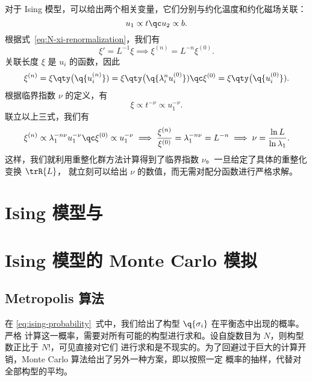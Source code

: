 对于 Ising 模型，可以给出两个相关变量，它们分别与约化温度和约化磁场关联：
\begin{equation}
  u_1 \propto t \qc u_2 \propto b.
\end{equation}
根据式~\eqref{eq:N-xi-renormalization}，我们有
\begin{equation}
  \xi' = L^{-1} \xi \implies \xi^{(n)} = L^{-n} \xi^{(0)}.
\end{equation}
关联长度 $\xi$ 是 $u_i$ 的函数，因此
\begin{equation}
  \xi^{(n)} = \xi\qty\big(\q{u_i^{(n)}}) = \xi\qty\big(\q{\lambda_i^n u_i^{(0)}}) \qc
  \xi^{(0)} = \xi\qty\big(\q{u_i^{(0)}}).
\end{equation}
根据临界指数 $\nu$ 的定义，有
\begin{equation}
  \xi \propto t^{-\nu} \propto u_1^{-\nu}.
\end{equation}
联立以上三式，我们有
\begin{equation}
  \xi^{(n)} \propto \lambda_1^{-n\nu} u_1^{-\nu} \qc
  \xi^{(0)} \propto u_1^{-\nu}
  \implies \frac{\xi^{(n)}}{\xi^{(0)}} = \lambda_1^{-n\nu} = L^{-n}
  \implies \nu = \frac{\ln L}{\ln \lambda_1}.
\end{equation}
这样，我们就利用重整化群方法计算得到了临界指数 $\nu$。一旦给定了具体的重整化变换 $\trR{L}$，
就立刻可以给出 $\nu$ 的数值，而无需对配分函数进行严格求解。

\section{Ising 模型与 \AdSCFT{}}

\section{Ising 模型的 Monte Carlo 模拟}

\subsection{Metropolis 算法}

在 \eqref{eq:ising-probability}~式中，我们给出了构型 $\q{\sigma_i}$ 在平衡态中出现的概率。严格
计算这一概率，需要对所有可能的构型进行求和。设自旋数目为 $N$，则构型数正比于 $N!$，可见直接对它们
进行求和是不现实的。为了回避过于巨大的计算开销，Monte Carlo 算法给出了另外一种方案，即以按照一定
概率的抽样，代替对全部构型的平均。

